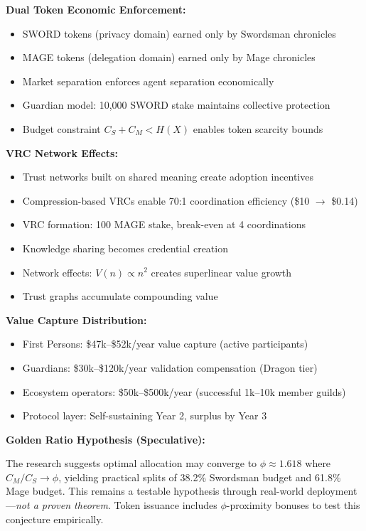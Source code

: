 \documentclass[11pt,a4paper]{article}
\theoremstyle{definition}
\begin{document}
\textbf{Dual Token Economic Enforcement:}

\begin{itemize}
    \item SWORD tokens (privacy domain) earned only by Swordsman chronicles
    \item MAGE tokens (delegation domain) earned only by Mage chronicles
    \item Market separation enforces agent separation economically
    \item Guardian model: 10,000 SWORD stake maintains collective protection
    \item Budget constraint $C_S + C_M < H(X)$ enables token scarcity bounds
\end{itemize}

\textbf{VRC Network Effects:}

\begin{itemize}
    \item Trust networks built on shared meaning create adoption incentives
    \item Compression-based VRCs enable 70:1 coordination efficiency (\$10 $\rightarrow$ \$0.14)
    \item VRC formation: 100 MAGE stake, break-even at 4 coordinations
    \item Knowledge sharing becomes credential creation
    \item Network effects: $V(n) \propto n^2$ creates superlinear value growth
    \item Trust graphs accumulate compounding value
\end{itemize}

\textbf{Value Capture Distribution:}

\begin{itemize}
    \item First Persons: \$47k--\$52k/year value capture (active participants)
    \item Guardians: \$30k--\$120k/year validation compensation (Dragon tier)
    \item Ecosystem operators: \$50k--\$500k/year (successful 1k--10k member guilds)
    \item Protocol layer: Self-sustaining Year 2, surplus by Year 3
\end{itemize}

\textbf{Golden Ratio Hypothesis (Speculative):}

The research suggests optimal allocation may converge to $\phi \approx 1.618$ where $C_M/C_S \rightarrow \phi$, yielding practical splits of 38.2\% Swordsman budget and 61.8\% Mage budget. This remains a testable hypothesis through real-world deployment---\textit{not a proven theorem}. Token issuance includes $\phi$-proximity bonuses to test this conjecture empirically.
\end{document}
